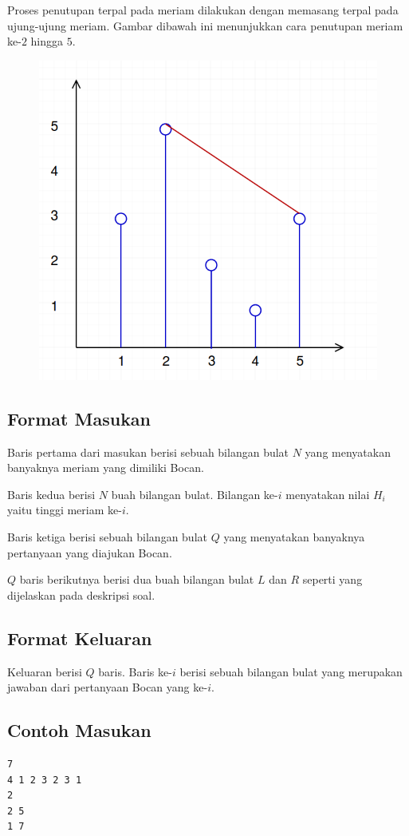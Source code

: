 \documentclass{article}
\begin{document}
\par\noindent Proses penutupan terpal pada meriam dilakukan dengan memasang terpal pada ujung-ujung meriam. Gambar dibawah ini menunjukkan cara penutupan meriam ke-$2$ hingga $5$.

\begin{figure}[h!]
	\centering
	\includegraphics[width=0.2\linewidth]{meriam2.png}
\end{figure}

\subsection*{Format Masukan}

\par\noindent Baris pertama dari masukan berisi sebuah bilangan bulat $N$ yang menyatakan banyaknya meriam yang dimiliki Bocan.
\par\noindent Baris kedua berisi $N$ buah bilangan bulat. Bilangan ke-$i$ menyatakan nilai $H_i$ yaitu tinggi meriam ke-$i$.
\par\noindent Baris ketiga berisi sebuah bilangan bulat $Q$ yang menyatakan banyaknya pertanyaan yang diajukan Bocan.
\par\noindent $Q$ baris berikutnya berisi dua buah bilangan bulat $L$ dan $R$ seperti yang dijelaskan pada deskripsi soal.

\subsection*{Format Keluaran}

\par\noindent Keluaran berisi $Q$ baris. Baris ke-$i$ berisi sebuah bilangan bulat yang merupakan jawaban dari pertanyaan Bocan yang ke-$i$.

\subsection*{Contoh Masukan}

\begin{lstlisting}
7
4 1 2 3 2 3 1
2
2 5
1 7
\end{lstlisting}
\end{document}
